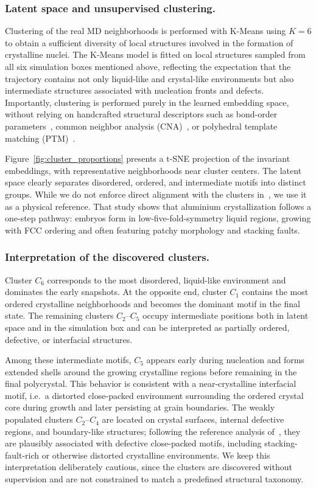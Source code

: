 \documentclass[runningheads]{llncs}
\begin{document}
\subsubsection{Latent space and unsupervised clustering.}

Clustering of the real MD neighborhoods is performed with K-Means using $K=6$ to obtain a sufficient diversity of local structures involved in the formation of crystalline nuclei. The K-Means model is fitted on local structures sampled from all six simulation boxes mentioned above, reflecting the expectation that the trajectory contains not only liquid-like and crystal-like environments but also intermediate structures associated with nucleation fronts and defects. Importantly, clustering is performed purely in the learned embedding space,
without relying on handcrafted structural descriptors such as bond-order parameters~\cite{steinhardt1983bond}, common neighbor
analysis (CNA)~\cite{honeycutt1987molecular}, or polyhedral template matching (PTM)~\cite{larsen2016robust}.

Figure~\ref{fig:cluster_proportions} presents a t-SNE projection of the invariant embeddings, with representative neighborhoods near cluster centers. The latent space clearly separates disordered, ordered, and intermediate motifs into distinct groups. While we do not enforce direct alignment with the clusters in~\cite{becker2022nucleation}, we use it as a physical reference. That study shows that aluminium crystallization follows a one-step pathway: embryos form in low-five-fold-symmetry liquid regions, growing with FCC ordering and often featuring patchy morphology and stacking faults.

\subsubsection{Interpretation of the discovered clusters.}
Cluster $C_6$ corresponds to the most disordered, liquid-like environment and dominates the early snapshots.
At the opposite end, cluster $C_1$ contains the most ordered crystalline neighborhoods and becomes the dominant motif in the final state.
The remaining clusters $C_2$--$C_5$ occupy intermediate positions both in latent space and in the simulation box and can be interpreted as partially ordered, defective, or interfacial structures.

Among these intermediate motifs, $C_5$ appears early during nucleation and forms extended shells around the growing crystalline regions before remaining in the final polycrystal.
This behavior is consistent with a near-crystalline interfacial motif, i.e.\ a distorted close-packed environment surrounding the ordered crystal core during growth and later persisting at grain boundaries.
The weakly populated clusters $C_2$--$C_4$ are located on crystal surfaces, internal defective regions, and boundary-like structures; following the reference analysis of~\cite{becker2022atomic}, they are plausibly associated with defective close-packed motifs, including stacking-fault-rich or otherwise distorted crystalline environments.
We keep this interpretation deliberately cautious, since the clusters are discovered without supervision and are not constrained to match a predefined structural taxonomy.
\end{document}
